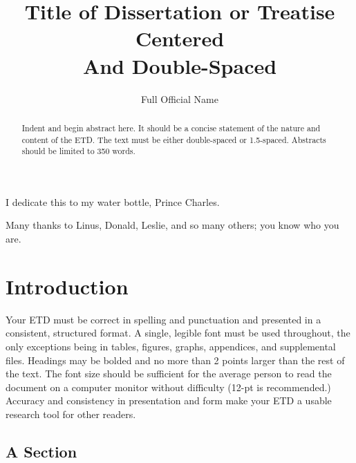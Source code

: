 \documentclass{utexasthesis}
\title{Title of Dissertation or Treatise Centered \\ And Double-Spaced}
\author{Full Official Name}
\begin{document}
\maketitle

\begin{dedication}
  I dedicate this to my water bottle, Prince Charles.
\end{dedication}


\begin{acknowledgments}
  Many thanks to Linus, Donald, Leslie, and so many others; you know who you are.
\end{acknowledgments}

\begin{abstract}
  Indent and begin abstract here. It should be a concise statement of the nature and content of the ETD. The text must be either double-spaced or 1.5-spaced. Abstracts should be limited to 350 words.
\end{abstract}

\maketableofcontents


\chapter{Introduction}

Your ETD must be correct in spelling and punctuation and presented in a consistent, structured format. A single, legible font must be used throughout, the only exceptions being in tables, figures, graphs, appendices, and supplemental files. Headings may be bolded and no more than 2 points larger than the rest of the text. The font size should be sufficient for the average person to read the document on a computer monitor without difficulty (12-pt is recommended.) Accuracy and consistency in presentation and form make your ETD a usable research tool for other readers.


\section{A Section}
\end{document}

